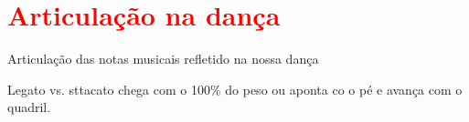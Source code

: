 
\section{\textcolor{red}{Articulação na dança }}
Articulação das notas musicais refletido na nossa dança

Legato vs. sttacato
chega com o 100\% do peso ou aponta co o pé e avança com o quadril.



